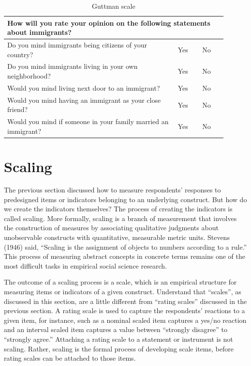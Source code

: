 \begin{description}
	\begin{table}[H]
	\centering
	\begin{tabularx}{0.95\linewidth}{p{0.70\linewidth}p{0.10\linewidth}p{0.10\linewidth}}
		\toprule
		\multicolumn{3}{p{0.95\linewidth}}{How will you rate your opinion on the following statements about immigrants?} \\	
		\midrule
		Do you mind immigrants being citizens of your country? & Yes & No \\
		Do you mind immigrants living in your own neighborhood? & Yes & No \\
		Would you mind living next door to an immigrant? & Yes & No \\
		Would you mind having an immigrant as your close friend? & Yes & No \\
		Would you mind if someone in your family married an immigrant? & Yes & No \\		
		\bottomrule
	\end{tabularx}
	\caption{Guttman scale}
	\label{tab06.05}
	\end{table}
	
\end{description}

\section{Scaling}

The previous section discussed how to measure respondents' responses to predesigned items or indicators belonging to an underlying construct. But how do we create the indicators themselves? The process of creating the indicators is called scaling. More formally, scaling is a branch of measurement that involves the construction of measures by associating qualitative judgments about unobservable constructs with quantitative, measurable metric units. Stevens (1946) said, ``Scaling is the assignment of objects to numbers according to a rule.'' This process of measuring abstract concepts in concrete terms remains one of the most difficult tasks in empirical social science research.

The outcome of a scaling process is a scale, which is an empirical structure for measuring items or indicators of a given construct. Understand that ``scales'', as discussed in this section, are a little different from ``rating scales'' discussed in the previous section. A rating scale is used to capture the respondents' reactions to a given item, for instance, such as a nominal scaled item captures a yes/no reaction and an interval scaled item captures a value between ``strongly disagree'' to ``strongly agree.'' Attaching a rating scale to a statement or instrument is not scaling. Rather, scaling is the formal process of developing scale items, before rating scales can be attached to those items.

